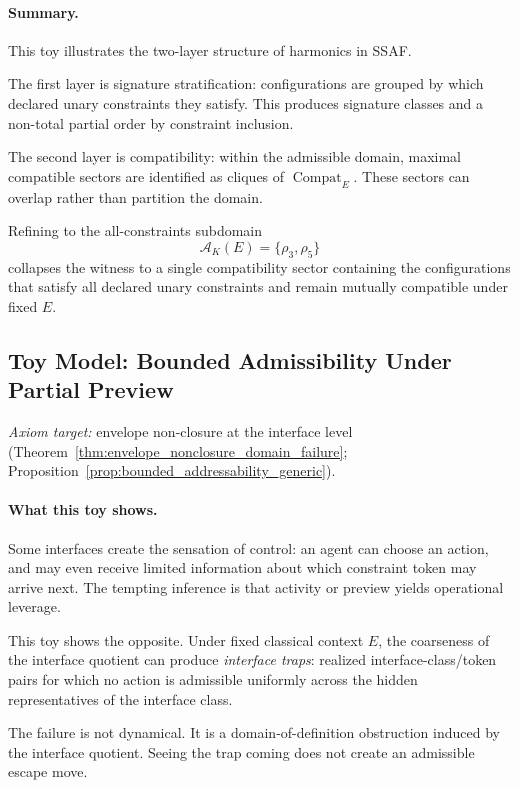 \documentclass[aps,prx,onecolumn,11pt]{revtex4-2}
\theoremstyle{plain}
\theoremstyle{definition}
\theoremstyle{remark}
\newcommand{\Compat}{\operatorname{Compat}} %
\begin{document}
\paragraph{Summary.}

This toy illustrates the two-layer structure of harmonics in SSAF.

The first layer is signature stratification: configurations are grouped
by which declared unary constraints they satisfy. This produces
signature classes and a non-total partial order by constraint
inclusion.

The second layer is compatibility: within the admissible domain,
maximal compatible sectors are identified as cliques of
\(\Compat_E\). These sectors can overlap rather than partition the
domain.

Refining to the all-constraints subdomain
\[
\mathcal A_K(E)
=
\{\rho_3,\rho_5\}
\]
collapses the witness to a single compatibility sector containing the
configurations that satisfy all declared unary constraints and remain
mutually compatible under fixed \(E\).

\subsection{Toy Model: Bounded Admissibility Under Partial Preview}
\label{toy:bounded_admissibility_preview}

\noindent\emph{Axiom target:} envelope non-closure at the interface level (Theorem~\ref{thm:envelope_nonclosure_domain_failure}; Proposition~\ref{prop:bounded_addressability_generic}).

\paragraph{What this toy shows.}

Some interfaces create the sensation of control: an agent can choose an
action, and may even receive limited information about which constraint
token may arrive next. The tempting inference is that activity or
preview yields operational leverage.

This toy shows the opposite. Under fixed classical context \(E\), the
coarseness of the interface quotient can produce \emph{interface
traps}: realized interface-class/token pairs for which no action is
admissible uniformly across the hidden representatives of the interface
class.

The failure is not dynamical. It is a domain-of-definition obstruction
induced by the interface quotient. Seeing the trap coming does not
create an admissible escape move.
\end{document}
